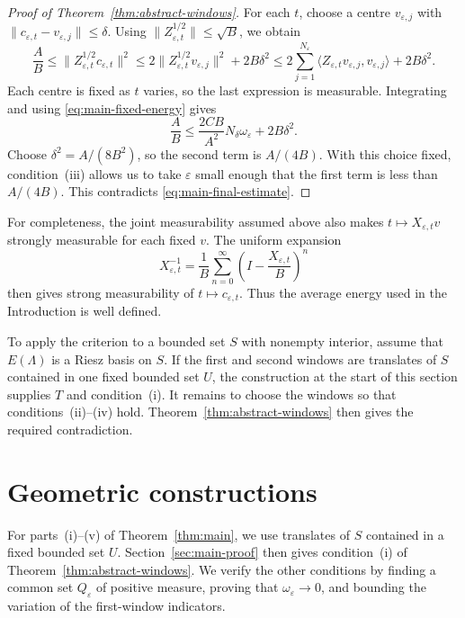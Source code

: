 \documentclass[10pt,a4paper]{amsart}
\newcommand\norm[1]{\|#1\|}
\newcommand\inpro[2]{\langle #1,#2\rangle}
\newcommand\1{\mathbbm{1}}
\newcommand{\eps}{\varepsilon}
\begin{document}
\begin{proof}[Proof of Theorem~\ref{thm:abstract-windows}]
For each $t$, choose a centre $v_{\eps,j}$ with
$\norm{c_{\eps,t}-v_{\eps,j}}\le\delta$.
Using $\norm{Z_{\eps,t}^{1/2}}\le\sqrt B$, we obtain
\begin{equation*}
    \frac AB
    \le\norm{Z_{\eps,t}^{1/2}c_{\eps,t}}^2
    \le2\norm{Z_{\eps,t}^{1/2}v_{\eps,j}}^2+2B\delta^2
    \le2\sum_{j=1}^{N_\eps}
       \inpro{Z_{\eps,t}v_{\eps,j}}{v_{\eps,j}}+2B\delta^2.
\end{equation*}
Each centre is fixed as $t$ varies, so the last expression is measurable.
Integrating and using \eqref{eq:main-fixed-energy} gives
\begin{equation}\label{eq:main-final-estimate}
    \frac AB
    \le\frac{2CB}{A^2}N_\delta\omega_\eps+2B\delta^2.
\end{equation}
Choose $\delta^2=A/(8B^2)$, so the second term is $A/(4B)$.
With this choice fixed, condition~(iii) allows us to take $\eps$ small enough
that the first term is less than $A/(4B)$.
This contradicts \eqref{eq:main-final-estimate}.
\end{proof}


For completeness, the joint measurability assumed above also makes
$t\mapsto X_{\eps,t}v$ strongly measurable for each fixed $v$.
The uniform expansion
\begin{equation*}
    X_{\eps,t}^{-1}=\frac1B\sum_{n=0}^{\infty}
    \left(I-\frac{X_{\eps,t}}B\right)^n
\end{equation*}
then gives strong measurability of $t\mapsto c_{\eps,t}$.
Thus the average energy used in the Introduction is well defined.

To apply the criterion to a bounded set $S$ with nonempty interior, assume
that $E(\Lambda)$ is a Riesz basis on $S$. If the first and second windows
are translates of $S$ contained in one fixed bounded set $U$, the construction
at the start of this section supplies $T$ and condition~(i).
It remains to choose the windows so that conditions~(ii)--(iv) hold.
Theorem~\ref{thm:abstract-windows} then gives the required contradiction.

\section{Geometric constructions}\label{sec:3}

For parts~(i)--(v) of Theorem~\ref{thm:main}, we use translates of $S$
contained in a fixed bounded set $U$.
Section~\ref{sec:main-proof} then gives condition~(i) of
Theorem~\ref{thm:abstract-windows}.
We verify the other conditions by finding a common set $Q_\eps$ of positive
measure, proving that $\omega_\eps\to0$, and bounding the variation of the
first-window indicators.
\end{document}
